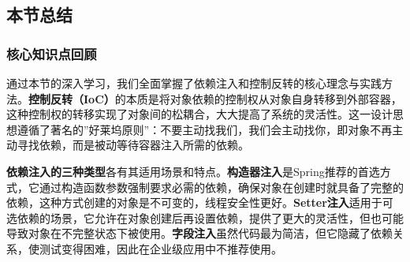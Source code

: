 \begin{Shaded}
\begin{Highlighting}[]
\OperatorTok{=}\OperatorTok{(}\OperatorTok{,}\OperatorTok{);}
        
        \OperatorTok{(}\OperatorTok{,}\OperatorTok{());}
        \OperatorTok{(}\OperatorTok{,}\OperatorTok{());}
        
        \OperatorTok{(}\OperatorTok{,} \OperatorTok{(}\OperatorTok{(}\OperatorTok{);}
        \OperatorTok{(}\OperatorTok{,} \OperatorTok{(}\OperatorTok{(),} \OperatorTok{(),} \OperatorTok{());}
    \OperatorTok{\}}
\OperatorTok{\}}
\end{Highlighting}
\end{Shaded}

\subsection{本节总结}\label{ux672cux8282ux603bux7ed3-1}

\subsubsection{核心知识点回顾}\label{ux6838ux5fc3ux77e5ux8bc6ux70b9ux56deux987e-1}

通过本节的深入学习，我们全面掌握了依赖注入和控制反转的核心理念与实践方法。\textbf{控制反转（IoC）}的本质是将对象依赖的控制权从对象自身转移到外部容器，这种控制权的转移实现了对象间的松耦合，大大提高了系统的灵活性。这一设计思想遵循了著名的''好莱坞原则''：不要主动找我们，我们会主动找你，即对象不再主动寻找依赖，而是被动等待容器注入所需的依赖。

\textbf{依赖注入的三种类型}各有其适用场景和特点。\textbf{构造器注入}是Spring推荐的首选方式，它通过构造函数参数强制要求必需的依赖，确保对象在创建时就具备了完整的依赖，这种方式创建的对象是不可变的，线程安全性更好。\textbf{Setter注入}适用于可选依赖的场景，它允许在对象创建后再设置依赖，提供了更大的灵活性，但也可能导致对象在不完整状态下被使用。\textbf{字段注入}虽然代码最为简洁，但它隐藏了依赖关系，使测试变得困难，因此在企业级应用中不推荐使用。

